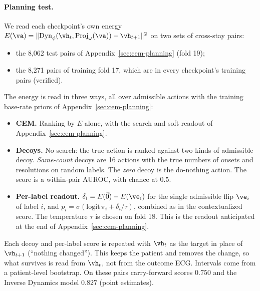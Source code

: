 \paragraph{Planning test.} We read each checkpoint's own energy $E(\va)=\lVert\text{Dyn}_\phi(\vh_t,\text{Proj}_\omega(\va))-\vh_{t+1}\rVert^2$ on two sets of cross-stay pairs:
\begin{itemize}
\item the 8{,}062 test pairs of Appendix~\ref{sec:cem-planning} (fold 19);
\item the 8{,}271 pairs of training fold 17, which are in every checkpoint's training pairs (verified).
\end{itemize}
The energy is read in three ways, all over admissible actions with the training base-rate priors of Appendix~\ref{sec:cem-planning}:
\begin{itemize}
\item \textbf{CEM.} Ranking by $E$ alone, with the search and soft readout of Appendix~\ref{sec:cem-planning}.
\item \textbf{Decoys.} No search: the true action is ranked against two kinds of admissible decoy. \emph{Same-count} decoys are 16 actions with the true numbers of onsets and resolutions on random labels. The \emph{zero} decoy is the do-nothing action. The score is a within-pair AUROC, with chance at $0.5$.
\item \textbf{Per-label readout.} $\delta_i=E(\vec 0)-E(\ve_i)$ for the single admissible flip $\ve_i$ of label $i$, and $p_i=\sigma(\text{logit}\,\pi_i+\delta_i/\tau)$, combined as in the contextualized score. The temperature $\tau$ is chosen on fold 18. This is the readout anticipated at the end of Appendix~\ref{sec:cem-planning}.
\end{itemize}
Each decoy and per-label score is repeated with $\vh_t$ as the target in place of $\vh_{t+1}$ (``nothing changed''). This keeps the patient and removes the change, so what survives is read from $\vh_t$, not from the outcome ECG. Intervals come from a patient-level bootstrap. On these pairs carry-forward scores $0.750$ and the Inverse Dynamics model $0.827$ (point estimates).


